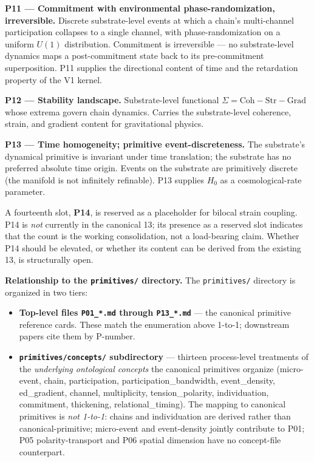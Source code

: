 \documentclass[11pt,a4paper]{article}
\begin{document}
\textbf{P11 --- Commitment with environmental phase-randomization, irreversible.} Discrete substrate-level events at which a chain's multi-channel participation collapses to a single channel, with phase-randomization on a uniform $U(1)$ distribution. Commitment is irreversible --- no substrate-level dynamics maps a post-commitment state back to its pre-commitment superposition. P11 supplies the directional content of time and the retardation property of the V1 kernel.

\textbf{P12 --- Stability landscape.} Substrate-level functional $\Sigma = \mathrm{Coh} - \mathrm{Str} - \mathrm{Grad}$ whose extrema govern chain dynamics. Carries the substrate-level coherence, strain, and gradient content for gravitational physics.

\textbf{P13 --- Time homogeneity; primitive event-discreteness.} The substrate's dynamical primitive is invariant under time translation; the substrate has no preferred absolute time origin. Events on the substrate are primitively discrete (the manifold is not infinitely refinable). P13 supplies $H_0$ as a cosmological-rate parameter.

A fourteenth slot, \textbf{P14}, is reserved as a placeholder for bilocal strain coupling. P14 is \emph{not} currently in the canonical 13; its presence as a reserved slot indicates that the count is the working consolidation, not a load-bearing claim. Whether P14 should be elevated, or whether its content can be derived from the existing 13, is structurally open.

\textbf{Relationship to the \texttt{primitives/} directory.} The \texttt{primitives/} directory is organized in two tiers:
\begin{itemize}[noitemsep]
\item \textbf{Top-level files \texttt{P01\_*.md} through \texttt{P13\_*.md}} --- the canonical primitive reference cards. These match the enumeration above 1-to-1; downstream papers cite them by P-number.
\item \textbf{\texttt{primitives/concepts/} subdirectory} --- thirteen process-level treatments of the \emph{underlying ontological concepts} the canonical primitives organize (micro-event, chain, participation, participation\_bandwidth, event\_density, ed\_gradient, channel, multiplicity, tension\_polarity, individuation, commitment, thickening, relational\_timing). The mapping to canonical primitives is \emph{not 1-to-1}: chains and individuation are derived rather than canonical-primitive; micro-event and event-density jointly contribute to P01; P05 polarity-transport and P06 spatial dimension have no concept-file counterpart.
\end{itemize}
\end{document}
